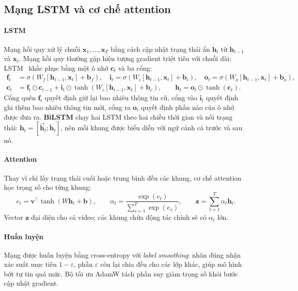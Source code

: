 \subsection{Mạng LSTM và cơ chế attention}
\label{subsec:lstm}

\paragraph*{LSTM} Mạng hồi quy xử lý chuỗi $\mathbf{x}_1,\dots,\mathbf{x}_T$ bằng cách cập nhật trạng thái ẩn $\mathbf{h}_t$ từ $\mathbf{h}_{t-1}$ và $\mathbf{x}_t$. Mạng hồi quy thường gặp hiện tượng gradient triệt tiêu với chuỗi dài; LSTM~\cite{hochreiter1997lstm} khắc phục bằng một ô nhớ $\mathbf{c}_t$ và ba cổng:
\begin{align}
  \mathbf{f}_t &= \sigma(W_f[\mathbf{h}_{t-1},\mathbf{x}_t]+\mathbf{b}_f), \quad
  \mathbf{i}_t = \sigma(W_i[\mathbf{h}_{t-1},\mathbf{x}_t]+\mathbf{b}_i), \quad
  \mathbf{o}_t = \sigma(W_o[\mathbf{h}_{t-1},\mathbf{x}_t]+\mathbf{b}_o), \\
  \mathbf{c}_t &= \mathbf{f}_t\odot\mathbf{c}_{t-1} + \mathbf{i}_t\odot\tanh(W_c[\mathbf{h}_{t-1},\mathbf{x}_t]+\mathbf{b}_c), \qquad
  \mathbf{h}_t = \mathbf{o}_t\odot\tanh(\mathbf{c}_t).
\end{align}
Cổng quên $\mathbf{f}_t$ quyết định giữ lại bao nhiêu thông tin cũ, cổng vào $\mathbf{i}_t$ quyết định ghi thêm bao nhiêu thông tin mới, cổng ra $\mathbf{o}_t$ quyết định phần nào của ô nhớ được đưa ra. \textbf{BiLSTM} chạy hai LSTM theo hai chiều thời gian và nối trạng thái: $\mathbf{h}_t=[\overrightarrow{\mathbf{h}}_t;\overleftarrow{\mathbf{h}}_t]$, nên mỗi khung được biểu diễn với ngữ cảnh cả trước và sau nó.

\paragraph*{Attention} Thay vì chỉ lấy trạng thái cuối hoặc trung bình đều các khung, cơ chế attention~\cite{bahdanau2015attention} học trọng số cho từng khung:
\begin{equation}
  e_t = \mathbf{v}^\top\tanh(W\mathbf{h}_t+\mathbf{b}), \qquad
  \alpha_t = \frac{\exp(e_t)}{\sum_{s=1}^{T}\exp(e_s)}, \qquad
  \mathbf{z} = \sum_{t=1}^{T}\alpha_t\mathbf{h}_t.
\end{equation}
Vector $\mathbf{z}$ đại diện cho cả video; các khung chứa động tác chính sẽ có $\alpha_t$ lớn.

\paragraph*{Huấn luyện} Mạng được huấn luyện bằng cross-entropy với \textit{label smoothing}: nhãn đúng nhận xác suất mục tiêu $1-\varepsilon$, phần $\varepsilon$ còn lại chia đều cho các lớp khác, giúp mô hình bớt tự tin quá mức. Bộ tối ưu AdamW tách phần suy giảm trọng số khỏi bước cập nhật gradient.

